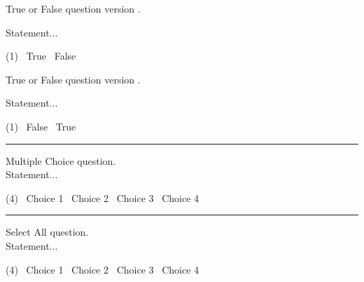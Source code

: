 \begin{question}[class=A]{2}
  \label{question:true-false-a}
  True or False question version \GetVersionID. \\
  \begin{minipage}{0.85\textwidth}
    Statement...
  \end{minipage}%
  \begin{minipage}{0.15\textwidth}
    \begin{tasks}(1)
      \task[\choice] \ True
      \task[\correctchoice] \ False
    \end{tasks}
  \end{minipage}
\end{question}

\begin{question}[class=B]{2}
  \label{question:true-false-b}
  True or False question version \GetVersionID. \\
  \begin{minipage}{0.85\textwidth}
    Statement...
  \end{minipage}%
  \begin{minipage}{0.15\textwidth}
    \begin{tasks}(1)
      \task[\correctchoice] \ False
      \task[\choice] \ True
    \end{tasks}
  \end{minipage}
\end{question}

\noindent\rule{\textwidth}{1pt}

\begin{question}{3}
  \label{question:multiple-choice}
  Multiple Choice question. \\
  Statement...
  \begin{tasks}(4)
    \task[\choice] \ Choice 1
    \task[\correctchoice] \ Choice 2
    \task[\choice] \ Choice 3
    \task[\choice] \ Choice 4
  \end{tasks}
\end{question}

\noindent\rule{\textwidth}{1pt}

\begin{question}{3}
  \label{question:select-all}
  Select All question. \\
  Statement...
  \begin{tasks}(4)
    \task[\selectall] \ Choice 1
    \task[\correctselectall] \ Choice 2
    \task[\selectall] \ Choice 3
    \task[\selectall] \ Choice 4
  \end{tasks}
\end{question}


